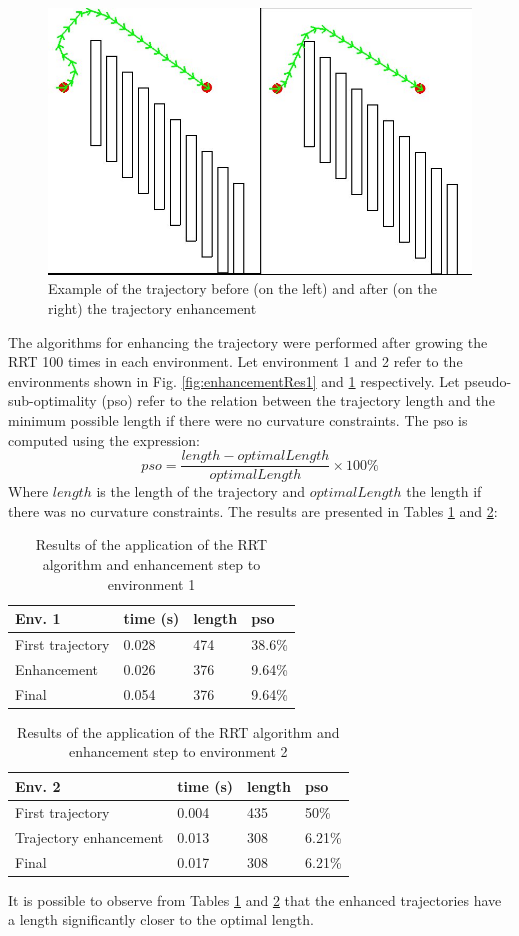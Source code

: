\begin{figure}[ht!]
    \centering
    \includegraphics[width=0.6\linewidth]{Figures/04_rrt/result4.jpg}
    \caption{Example of the trajectory before (on the left) and after (on the right) the trajectory enhancement}
    \label{fig:enhancementRes2}
\end{figure}


The algorithms for enhancing the trajectory were performed after growing the RRT 100 times in each environment. Let environment 1 and 2 refer to the environments shown in Fig. \ref{fig:enhancementRes1} and \ref{fig:enhancementRes2} respectively. Let pseudo-sub-optimality (pso) refer to the relation between the trajectory length and the minimum possible length if there were no curvature constraints. The pso is computed using the expression:
$$
pso=\frac{length-optimalLength}{optimalLength} \times 100\%
$$
Where $length$ is the length of the trajectory and $optimalLength$ the length if there was no curvature constraints. The results are presented in Tables \ref{tab:enhancement1} and \ref{tab:enhancement2}:


\begin{table}[ht!]
\begin{tabular}{|l|lll|}
\hline
Env. 1       &  time (s) & length    & pso     \\ \hline
First trajectory    &   0.028   & 474               &  38.6\%                   \\
Enhancement & 0.026  & 376               &  9.64\%                   \\
Final               & 0.054     & 376               &  9.64\%         \\ \hline
\end{tabular}
\caption{Results of the application of the RRT algorithm and enhancement step to environment 1}
\label{tab:enhancement1}
\end{table}

\begin{table}[ht!]
\begin{tabular}{|l|lll|}
\hline
Env. 2       &  time (s) & length & pso \\ \hline
First trajectory    & 0.004     & 435            & 50\%                   \\
Trajectory enhancement & 0.013  & 308            & 6.21\%                 \\
Final               & 0.017     & 308            & 6.21\%                 \\ \hline
\end{tabular}
\caption{Results of the application of the RRT algorithm and enhancement step to environment 2}
\label{tab:enhancement2}
\end{table}

It is possible to observe from Tables \ref{tab:enhancement1} and \ref{tab:enhancement2} that the enhanced trajectories have a length significantly closer to the optimal length.